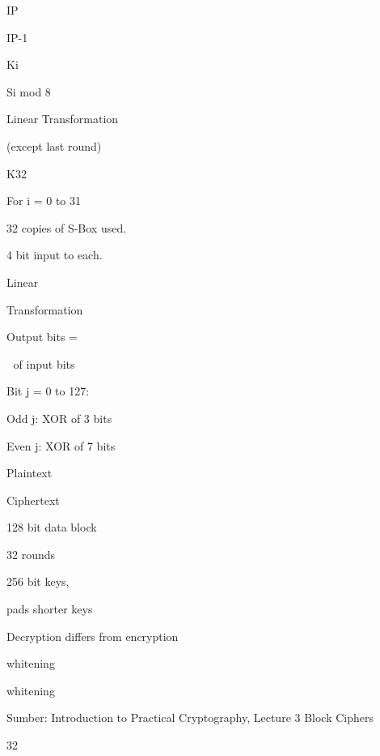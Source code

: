 \documentclass{article}
\begin{document}

IP

IP-1 

Ki 

Si mod 8 

Linear Transformation

(except last round)

K32 

For i = 0 to 31 

32 copies of S-Box used.

4 bit input to each.

Linear 

Transformation

Output bits = 

 of input bits

Bit j = 0 to 127:

Odd j: XOR of 3 bits

Even j: XOR of 7 bits

Plaintext

Ciphertext

128 bit data block

32 rounds

256 bit keys, 

pads shorter keys 

Decryption differs from encryption

whitening

whitening

Sumber: Introduction to Practical Cryptography, Lecture 3 Block Ciphers 

32
\end{document}

